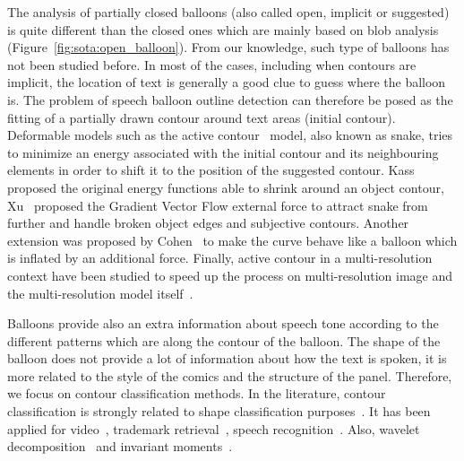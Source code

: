 The analysis of partially closed balloons (also called open, implicit or suggested) is quite different than the closed ones which are mainly based on blob analysis (Figure~\ref{fig:sota:open_balloon}).
From our knowledge, such type of balloons has not been studied before.
In most of the cases, including when contours are implicit, the location of text is generally a good clue to guess where the balloon is.
The problem of speech balloon outline detection can therefore be posed as the fitting of a partially drawn contour around text areas (initial contour).
Deformable models such as the active contour~\cite{Kass1988} model, also known as snake, tries to minimize an energy associated with the initial contour and its neighbouring elements in order to shift it to the position of the suggested contour.
Kass~\cite{Kass1988} proposed the original energy functions able to shrink around an object contour, Xu~\cite{Xu1998} proposed the Gradient Vector Flow external force to attract snake from further and handle broken object edges and subjective contours.
Another extension was proposed by Cohen~\cite{Cohen1991} to make the curve behave like a balloon which is inflated by an additional force.
Finally, active contour in a multi-resolution context have been studied to speed up the process on multi-resolution image and the multi-resolution model itself~\cite{Leroy1996}.


Balloons provide also an extra information about speech tone according to the different patterns which are along the contour of the balloon.
The shape of the balloon does not provide a lot of information about how the text is spoken, it is more related to the style of the comics and the structure of the panel.
Therefore, we focus on contour classification methods.
In the literature, contour classification is strongly related to shape classification purposes~\cite{sun2005classification,liu1990partial}.
It has been applied for video~\cite{kuhne2001motion,richter2001contour,bader2009}, trademark retrieval~\cite{leung2002trademark}, speech recognition~\cite{grigoriu1994automatic}.
Also, wavelet decomposition~\cite{tieng1997recognition} and invariant moments~\cite{mukundan1998moment}. 

